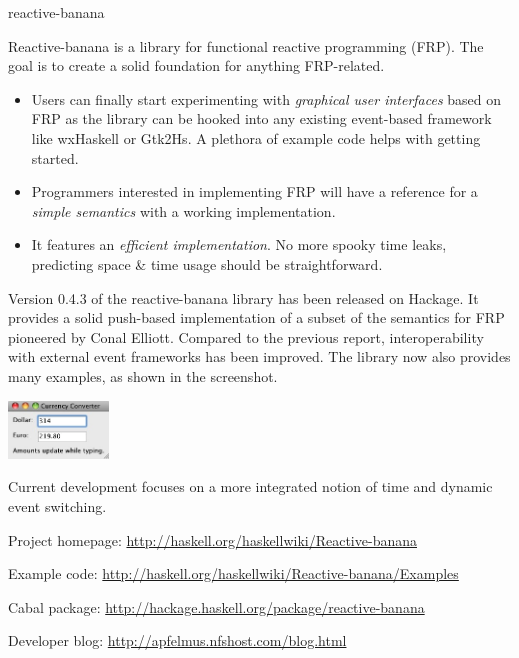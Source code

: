 \begin{hcarentry}[updated]{reactive-banana}
\makeheader

Reactive-banana is a library for functional reactive programming (FRP). The goal is to create a solid foundation for anything FRP-related.

\begin{itemize}
\item Users can finally start experimenting with \emph{graphical user interfaces} based on FRP as the library can be hooked into any existing event-based framework like wxHaskell or Gtk2Hs. A plethora of example code helps with getting started.
\item Programmers interested in implementing FRP will have a reference for a \emph{simple semantics} with a working implementation.
\item It features an \emph{efficient implementation}. No more spooky time leaks, predicting space \& time usage should be straightforward.
\end{itemize}

Version 0.4.3 of the reactive-banana library has been released on Hackage. It provides a solid push-based implementation of a subset of the semantics for FRP pioneered by Conal Elliott. Compared to the previous report, interoperability with external event frameworks has been improved. The library now also provides many examples, as shown in the screenshot.

\begin{center}
\includegraphics[width=0.2\textwidth]{html/hcar-reactive-banana-01.jpg}
\end{center}

Current development focuses on a more integrated notion of time and dynamic event switching.

\FurtherReading
\begin{compactitem}
\item Project homepage: \url{http://haskell.org/haskellwiki/Reactive-banana}
\item Example code: \url{http://haskell.org/haskellwiki/Reactive-banana/Examples}
\item Cabal package: \url{http://hackage.haskell.org/package/reactive-banana}
\item Developer blog:  \url{http://apfelmus.nfshost.com/blog.html}
\end{compactitem}
\end{hcarentry}
